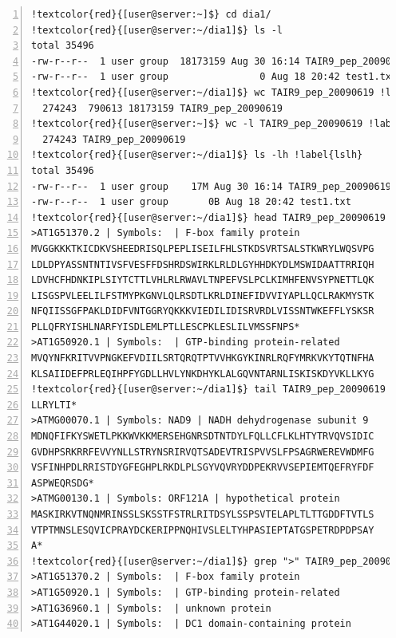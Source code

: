 \documentclass[letter,11pt]{book}
\begin{document}
\begin{Verbatim}[commandchars=!\{\},numbers=left,firstnumber=last,label=Operaciones básicas con archivos,frame=topline,fontsize=\scriptsize]
!textcolor{red}{[user@server:~]$} cd dia1/
!textcolor{red}{[user@server:~/dia1]$} ls -l
total 35496
-rw-r--r--  1 user group  18173159 Aug 30 16:14 TAIR9_pep_20090619 !label{tamanoarapep}
-rw-r--r--  1 user group                0 Aug 18 20:42 test1.txt
!textcolor{red}{[user@server:~/dia1]$} wc TAIR9_pep_20090619 !label{wc}
  274243  790613 18173159 TAIR9_pep_20090619
!textcolor{red}{[user@server:~]$} wc -l TAIR9_pep_20090619 !label{wcl}
  274243 TAIR9_pep_20090619
!textcolor{red}{[user@server:~/dia1]$} ls -lh !label{lslh}
total 35496
-rw-r--r--  1 user group    17M Aug 30 16:14 TAIR9_pep_20090619
-rw-r--r--  1 user group       0B Aug 18 20:42 test1.txt
!textcolor{red}{[user@server:~/dia1]$} head TAIR9_pep_20090619 !label{head10}
>AT1G51370.2 | Symbols:  | F-box family protein
MVGGKKKTKICDKVSHEEDRISQLPEPLISEILFHLSTKDSVRTSALSTKWRYLWQSVPG
LDLDPYASSNTNTIVSFVESFFDSHRDSWIRKLRLDLGYHHDKYDLMSWIDAATTRRIQH
LDVHCFHDNKIPLSIYTCTTLVHLRLRWAVLTNPEFVSLPCLKIMHFENVSYPNETTLQK
LISGSPVLEELILFSTMYPKGNVLQLRSDTLKRLDINEFIDVVIYAPLLQCLRAKMYSTK
NFQIISSGFPAKLDIDFVNTGGRYQKKKVIEDILIDISRVRDLVISSNTWKEFFLYSKSR
PLLQFRYISHLNARFYISDLEMLPTLLESCPKLESLILVMSSFNPS*
>AT1G50920.1 | Symbols:  | GTP-binding protein-related
MVQYNFKRITVVPNGKEFVDIILSRTQRQTPTVVHKGYKINRLRQFYMRKVKYTQTNFHA
KLSAIIDEFPRLEQIHPFYGDLLHVLYNKDHYKLALGQVNTARNLISKISKDYVKLLKYG
!textcolor{red}{[user@server:~/dia1]$} tail TAIR9_pep_20090619 !label{tail10}
LLRYLTI*
>ATMG00070.1 | Symbols: NAD9 | NADH dehydrogenase subunit 9
MDNQFIFKYSWETLPKKWVKKMERSEHGNRSDTNTDYLFQLLCFLKLHTYTRVQVSIDIC
GVDHPSRKRRFEVVYNLLSTRYNSRIRVQTSADEVTRISPVVSLFPSAGRWEREVWDMFG
VSFINHPDLRRISTDYGFEGHPLRKDLPLSGYVQVRYDDPEKRVVSEPIEMTQEFRYFDF
ASPWEQRSDG*
>ATMG00130.1 | Symbols: ORF121A | hypothetical protein
MASKIRKVTNQNMRINSSLSKSSTFSTRLRITDSYLSSPSVTELAPLTLTTGDDFTVTLS
VTPTMNSLESQVICPRAYDCKERIPPNQHIVSLELTYHPASIEPTATGSPETRDPDPSAY
A*
!textcolor{red}{[user@server:~/dia1]$} grep ">" TAIR9_pep_20090619 | head -n 4  !label{grepsimple}
>AT1G51370.2 | Symbols:  | F-box family protein
>AT1G50920.1 | Symbols:  | GTP-binding protein-related
>AT1G36960.1 | Symbols:  | unknown protein
>AT1G44020.1 | Symbols:  | DC1 domain-containing protein
\end{Verbatim} 
\end{document}
